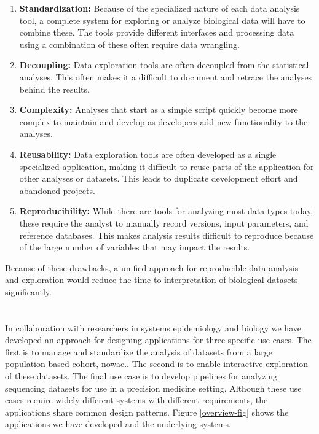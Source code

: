 \begin{enumerate}
    \item \textbf{Standardization:} Because of the specialized nature of each
        data analysis tool, a complete system for exploring or analyze
        biological data will have to combine these. The tools provide different
        interfaces and processing data using a combination of these often
        require data wrangling. 
    \item \textbf{Decoupling:} Data exploration tools are often decoupled from
        the statistical analyses. This often makes it a difficult to document
        and retrace the analyses behind the results. 
    \item \textbf{Complexity:} 
        Analyses that start as a simple script quickly become more complex to
        maintain and develop as developers add new functionality to the
        analyses.
    \item \textbf{Reusability:} Data exploration tools are often
        developed as a single specialized application, making it difficult to
        reuse parts of the application for other analyses or datasets. This
        leads to duplicate development effort and abandoned projects. 
    \item \textbf{Reproducibility:} While there are tools for analyzing most
        data types today, these require the analyst to manually record versions,
        input parameters, and reference databases. This makes analysis results
        difficult to reproduce because of the large number of variables that may
        impact the results. 
\end{enumerate} 

Because of these drawbacks, a unified approach for reproducible data analysis
and exploration would reduce the time-to-interpretation of biological datasets
significantly. 

\section{} 
In collaboration with researchers in systems epidemiology and biology we have
developed an approach for designing applications for three specific use cases.
The first is to manage and standardize the analysis of datasets from a large
population-based cohort, \gls{nowac}.\cite{nowac}. The second is to enable
interactive exploration of these datasets.  The final use case is to develop
pipelines for analyzing sequencing datasets for use in a precision medicine
setting.  Although these use cases require widely different systems with
different requirements, the applications share common design patterns.  Figure
\ref{overview-fig} shows the applications we have developed and the underlying
systems. 

